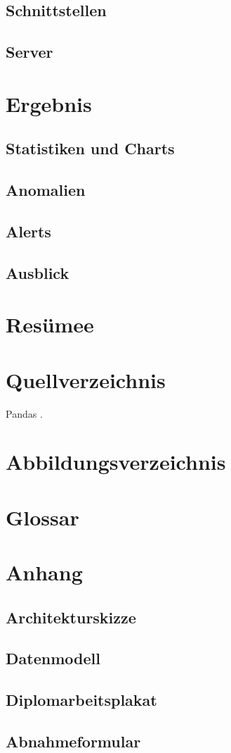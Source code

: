 \documentclass{report}
\begin{document}
\section{Schnittstellen}
\section{Server}


\chapter{Ergebnis}
\section{Statistiken und Charts}
\section{Anomalien}
\section{Alerts}
\section{Ausblick}

\chapter{Resümee}


\chapter*{Quellverzeichnis}
Pandas \citep{pandas_docs}.

\chapter*{Abbildungsverzeichnis}

\chapter*{Glossar}

\chapter*{Anhang}
\section{Architekturskizze}
\section{Datenmodell}
\section{Diplomarbeitsplakat}
\section{Abnahmeformular}
\end{document}
